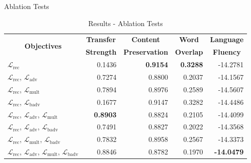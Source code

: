 \documentclass[aspectratio=169]{beamer}
\newcommand{\loss}[1]{\mathcal{L}_{\text{#1}}}
\newcommand{\tabh}[1]{\multicolumn{1}{c|}{\textbf{#1}}}
\newcommand{\tabc}[2]{\multicolumn{1}{|c||}{\multirow{#1}{*}{\textbf{#2}}}}
\begin{document}
\begin{frame}{Ablation Tests}
	\begin{table}[ht]
		\centering
		\begin{tabular}{| l || r | r | r | r |}
			\hline
			\tabc{2}{Objectives}                                     & \tabh{Transfer} & \tabh{Content}      & \tabh{Word}     & \tabh{Language}   \\
			                                                         & \tabh{Strength} & \tabh{Preservation} & \tabh{Overlap}  & \tabh{Fluency}    \\
			\hline
			\hline
			$\loss{rec}$                                             & 0.1436          & \textbf{0.9154}     & \textbf{0.3288} & -14.2781          \\
			\hline
			$\loss{rec}$, $\loss{adv}$                               & 0.7274          & 0.8800              & 0.2037          & -14.1567          \\
			\hline
			$\loss{rec}$, $\loss{mult}$                              & 0.7894          & 0.8976              & 0.2589          & -14.5607          \\
			\hline
			$\loss{rec}$, $\loss{badv}$                              & 0.1677          & 0.9147              & 0.3282          & -14.4486          \\
			\hline
			$\loss{rec}$, $\loss{adv}$, $\loss{mult}$                & \textbf{0.8903} & 0.8824              & 0.2105          & -14.4099          \\
			\hline
			$\loss{rec}$, $\loss{adv}$, $\loss{badv}$                & 0.7491          & 0.8827              & 0.2022          & -14.3568          \\
			\hline
			$\loss{rec}$, $\loss{mult}$, $\loss{badv}$               & 0.7832          & 0.8958              & 0.2567          & -14.3373          \\
			\hline
			$\loss{rec}$, $\loss{adv}$, $\loss{mult}$, $\loss{badv}$ & 0.8846          & 0.8782              & 0.1970          & \textbf{-14.0479} \\
			\hline
		\end{tabular}
		\caption{Results - Ablation Tests}
		\label{tab:ablation-results}
	\end{table}
\end{frame}
\end{document}
